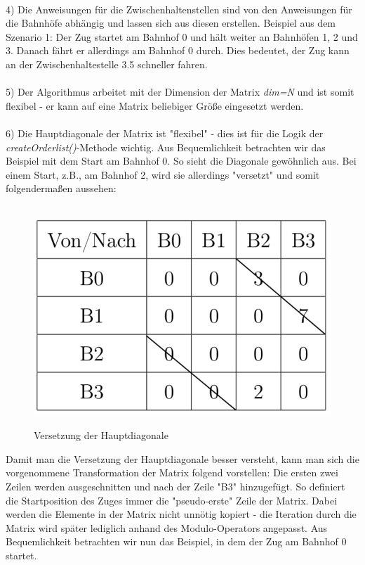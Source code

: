 \\
4) Die Anweisungen für die Zwischenhaltenstellen sind von den Anweisungen für die Bahnhöfe abhängig und lassen sich aus diesen erstellen. Beispiel aus dem Szenario 1: Der Zug startet am Bahnhof 0 und hält weiter an Bahnhöfen 1, 2 und 3. Danach fährt er allerdings am Bahnhof 0 durch. Dies bedeutet, der Zug kann an der Zwischenhaltestelle 3.5 schneller fahren.\\
\\
5) Der Algorithmus arbeitet mit der Dimension der Matrix \textit{dim=N} und ist somit flexibel - er kann auf eine Matrix beliebiger Größe eingesetzt werden.\\
\\
6) Die Hauptdiagonale der Matrix ist "flexibel" - dies ist für die Logik der \textit{createOrderlist()}-Methode wichtig. Aus Bequemlichkeit betrachten wir das Beispiel mit dem Start am Bahnhof 0. So sieht die Diagonale gewöhnlich aus. Bei einem Start, z.B., am Bahnhof 2, wird sie allerdings "versetzt" und somit folgendermaßen aussehen:\\
\\
\begin{figure}[H]	
\caption{Versetzung der Hauptdiagonale}
\center
\includegraphics[width=2\textwidth, width=270pt]{content/images/matrix2.png}
\label{pic:DiagonaleVersetzt}
\end{figure}
\noindent
Damit man die Versetzung der Hauptdiagonale besser versteht, kann man sich die vorgenommene Transformation der Matrix folgend vorstellen: Die ersten zwei Zeilen werden ausgeschnitten und nach der Zeile "B3" hinzugefügt. So definiert die Startposition des Zuges immer die "pseudo-erste" Zeile der Matrix. Dabei werden die Elemente in der Matrix nicht unnötig kopiert - die Iteration durch die Matrix wird später lediglich anhand des Modulo-Operators angepasst. Aus Bequemlichkeit betrachten wir nun das Beispiel, in dem der Zug am Bahnhof 0 startet.\\
